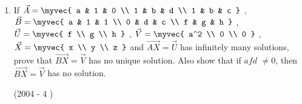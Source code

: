 \begin{enumerate}
	\item If $\vec{A} = \myvec{
			a & 1 & 0 \\
			1 & b & d \\
			1 & b & c }$ ,
		$\vec{B} = \myvec{
			a & 1 & 1 \\
			0 & d & c \\
			f & g & h }$ ,
		$\vec{U} = \myvec{
			f \\
			g \\
			h }$ ,
		$\vec{V} = \myvec{
			a^2 \\
			0 \\
			0 }$ ,
		$\vec{X} = \myvec{
			x \\
			y \\
			z }$
		and $\vec{AX}=\vec{U}$ has infinitely many solutions, prove that $\vec{BX}=\vec{V}$ has no unique solution. Also show that if $afd$ $\neq0$, then $\vec{BX}=\vec{V}$ has no solution.

		\hfill(2004 - 4 )



\end{enumerate}
